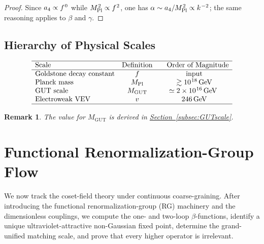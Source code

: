 \documentclass[pdflatex,sn-mathphys-num]{sn-jnl}
\theoremstyle{thmstyleone}
\theoremstyle{thmstyletwo}%
\newtheorem{remark}{Remark}%
\theoremstyle{thmstylethree}%
\newcommand{\sm}{\hspace{.065em}}
\newcommand{\subsecref}[1]{\hyperref[#1]{Section~\ref*{#1}}}
\newcommand{\smexp}[1]{^{\sm #1}}
\begin{document}
\begin{proof}
Since $a_{4} \propto f\smexp{0}$ while $M_{\mathrm{Pl}}\smexp{2} \propto f\smexp{2}$,
one has $\alpha \sim a_{4} / M_{\mathrm{Pl}}\smexp{2} \propto k\smexp{-2}$; the
same reasoning applies to $\beta$ and $\gamma$.
\end{proof}

\subsection{Hierarchy of Physical Scales}
\label{subsec:scales}

\[
\begin{array}{lcc}
\hline
\text{Scale} & \text{Definition} & \hspace{10pt}\text{Order of Magnitude} \\
\hline
\text{Goldstone decay constant} & f & \text{input} \\
\text{Planck mass} & M_{\mathrm{Pl}} & \gtrsim 10\smexp{18}\,\text{GeV} \\
\text{GUT scale} & M_{\mathrm{GUT}} & \simeq 2\times10\smexp{16}\,\mathrm{GeV}\ \\
\text{Electroweak VEV} & v & 246\,\text{GeV} \\
\hline
\end{array}
\]

\begin{remark}
  The value for $M_{\mathrm{GUT}}$ is derived in \subsecref{subsec:GUTscale}.
\end{remark}

\section{Functional Renormalization-Group Flow}
\label{sec:FRG}

We now track the coset-field theory under continuous coarse-graining.
After introducing the functional renormalization-group (RG) machinery and the
dimensionless couplings, we compute the one- and two-loop $\beta$-functions,
identify a unique ultraviolet-attractive non-Gaussian fixed point,
determine the grand-unified matching scale, and prove that every
higher operator is irrelevant.

\end{document}
